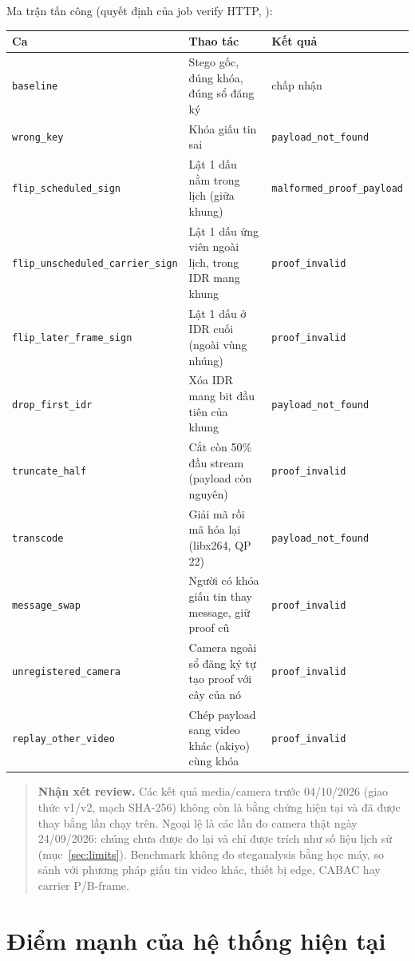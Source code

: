 \documentclass[10pt,a4paper]{article}
\newcommand{\review}[1]{\begin{quote}\colorbox{ReviewBg}{\parbox{0.94\linewidth}{\textbf{Nhận xét review.} #1}}\end{quote}}
\begin{document}
Ma trận tấn công (quyết định của job verify HTTP, ):

\begin{longtable}{@{}p{.34\linewidth}p{.34\linewidth}p{.26\linewidth}@{}}
\toprule
\textbf{Ca} & \textbf{Thao tác} & \textbf{Kết quả}\tabularnewline
\midrule\endhead
\texttt{baseline} & Stego gốc, đúng khóa, đúng sổ đăng ký & chấp nhận\\
\texttt{wrong\_key} & Khóa giấu tin sai & \texttt{payload\_not\_found}\\
\texttt{flip\_scheduled\_sign} & Lật 1 dấu nằm trong lịch (giữa khung) & \texttt{malformed\_proof\_payload}\\
\texttt{flip\_unscheduled\_carrier\_sign} & Lật 1 dấu ứng viên ngoài lịch, trong IDR mang khung & \texttt{proof\_invalid}\\
\texttt{flip\_later\_frame\_sign} & Lật 1 dấu ở IDR cuối (ngoài vùng nhúng) & \texttt{proof\_invalid}\\
\texttt{drop\_first\_idr} & Xóa IDR mang bit đầu tiên của khung & \texttt{payload\_not\_found}\\
\texttt{truncate\_half} & Cắt còn 50\% đầu stream (payload còn nguyên) & \texttt{proof\_invalid}\\
\texttt{transcode} & Giải mã rồi mã hóa lại (libx264, QP 22) & \texttt{payload\_not\_found}\\
\texttt{message\_swap} & Người có khóa giấu tin thay message, giữ proof cũ & \texttt{proof\_invalid}\\
\texttt{unregistered\_camera} & Camera ngoài sổ đăng ký tự tạo proof với cây của nó & \texttt{proof\_invalid}\\
\texttt{replay\_other\_video} & Chép payload sang video khác (akiyo) cùng khóa & \texttt{proof\_invalid}\\
\bottomrule
\end{longtable}

\review{Các kết quả media/camera trước 04/10/2026 (giao thức v1/v2, mạch SHA-256) không còn là bằng chứng hiện tại và đã được thay bằng lần chạy trên. Ngoại lệ là các lần đo camera thật ngày 24/09/2026: chúng chưa được đo lại và chỉ được trích như số liệu lịch sử (mục~\ref{sec:limits}). Benchmark không đo steganalysis bằng học máy, so sánh với phương pháp giấu tin video khác, thiết bị edge, CABAC hay carrier P/B-frame.}

\section{Điểm mạnh của hệ thống hiện tại}
\end{document}
